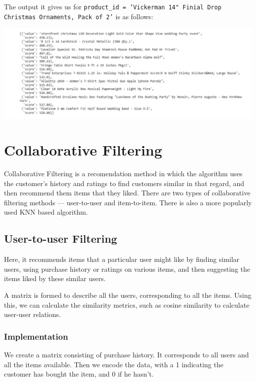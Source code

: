 \documentclass{article}
\begin{document}
The output it gives us for \texttt{product\_id = 'Vickerman 14" Finial Drop Christmas Ornaments, Pack of 2'} is as follows:

\begin{center}
\includegraphics[scale=0.35]{01.png}
\end{center}

\section{Collaborative Filtering}

Collaborative Filtering is a recomendation method in which the algorithm uses the customer's history and ratings to find customers similar in that regard, and then recommend them items that they liked. There are two types of collaborative filtering methods — user-to-user and item-to-item. There is also a more popularly used KNN based algorithm.

\subsection{User-to-user Filtering}

Here, it recommends items that a particular user might like by finding similar users, using purchase history or ratings on various items, and then suggesting the items liked by these similar users.

\medskip

A matrix is formed to describe all the users, corresponding to all the items. Using this, we can calculate the similarity metrics, such as cosine similarity to calculate user-user relations.

\subsubsection{Implementation}

We create a matrix consisting of purchase history. It corresponds to all users and all the items available. Then we encode the data, with a 1 indicating the customer has bought the item, and 0 if he hasn't.
\end{document}
